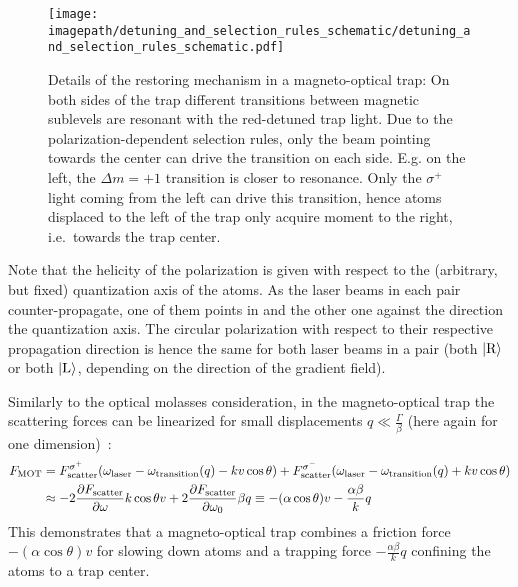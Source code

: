 \begin{figure}
    \centering
    \texttt{[image: \\imagepath/detuning\_and\_selection\_rules\_schematic/detuning\_and\_selection\_rules\_schematic.pdf]}
    \caption{Details of the restoring mechanism in a magneto-optical trap: On both sides of the trap different transitions between magnetic sublevels are resonant with the red-detuned trap light. Due to the polarization-dependent selection rules, only the  beam pointing towards the center can drive the transition on each side. E.g. on the left, the $\Delta  m = +1$ transition is closer to resonance. Only the $\sigma^+$ light coming from the left can drive this transition, hence atoms displaced to the left of the trap only acquire moment to the right, i.e.~towards the trap center.}
    \label{fig:detuning_and_selection_rules_schematic}
\end{figure}

Note that the helicity of the polarization is given with respect to the (arbitrary, but fixed) quantization axis of the atoms. As the laser beams in each pair counter-propagate, one of them points in and the other one against the direction the quantization axis. The circular polarization with respect to their respective propagation direction is hence the same for both laser beams in a pair (both $\Ket{\text{R}}$ or both $\Ket{\text{L}}$, depending on the direction of the gradient field).


Similarly to the optical molasses consideration, in the magneto-optical trap the scattering forces can be linearized for small displacements $q \ll \frac{\Gamma}{\beta}$ (here again for one dimension)~\cite{foot_atomic_2005}:
\begin{equation}\label{eq:mot_force}
    \begin{split}
        F_\text{MOT} &= F_\text{scatter}^{\sigma^+}(\omega_\text{laser} - \omega_\text{transition}(q) - kv \cos \theta) + F_\text{scatter}^{\sigma^-}(\omega_\text{laser} - \omega_\text{transition}(q) + kv \cos \theta)\\
        &\approx -2 \pdv{F_\text{scatter}}{\omega} k\cos \theta v + 2 \pdv{F_\text{scatter}}{\omega_0} \beta q  \equiv - (\alpha \cos \theta) v - \frac{\alpha \beta}{k} q
    \end{split}
\end{equation}
This demonstrates that a magneto-optical trap combines a friction force $-(\alpha \cos \theta) v$ for slowing down atoms and a trapping force $- \frac{\alpha \beta}{k} q$ confining the atoms to a trap center.

